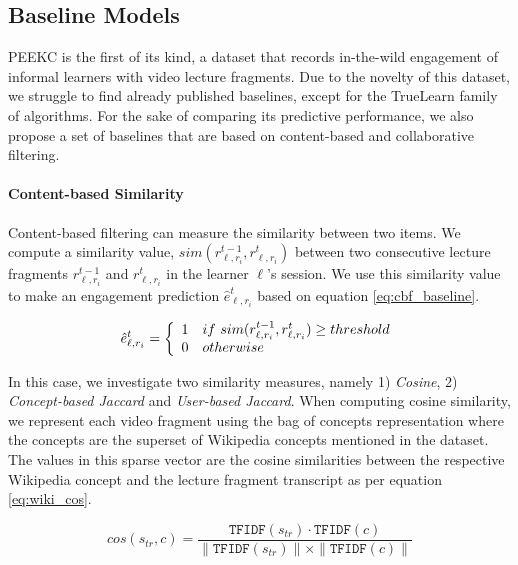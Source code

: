 \documentclass[letterpaper]{article} %
\begin{document}
\subsection{Baseline Models}

PEEKC is the first of its kind, a dataset that records in-the-wild  engagement of informal learners with video lecture fragments. Due to the novelty of this dataset, we struggle to find already published baselines, except for the TrueLearn family of algorithms. 
For the sake of comparing its predictive performance,  we also propose a set of baselines that are based on content-based and collaborative filtering.

\paragraph{Content-based Similarity} Content-based filtering can measure the similarity between two items. We compute a similarity value, $sim(r^{t-1}_{\ell,r_i},r^{t}_{\ell,r_i})$ between two consecutive lecture fragments $r^{t-1}_{\ell,r_i}$ and $r^{t}_{\ell,r_i}$ in the learner  $\ell$'s session. We use this similarity value to make an engagement prediction $\hat{e}^t_{\ell,r_i}$ based on equation \ref{eq:cbf_baseline}.

\begin{equation} \label{eq:cbf_baseline}\centering 
    \hat{e}^t_{\ell,r_i} = 
    \left\{ 
      \begin{array}{ c l }
        1                 &  if\ sim(r^{t-1}_{\ell,r_i},r^{t}_{\ell,r_i}) \geq threshold \\
        0                 & otherwise
      \end{array}
    \right.
\end{equation}

In this case, we investigate two similarity measures, namely 1) \emph{Cosine}, 2) \emph{Concept-based Jaccard} and \emph{User-based Jaccard}. When computing cosine similarity, we represent each video fragment using the bag of concepts representation where the concepts are the superset of Wikipedia concepts mentioned in the dataset. The values in this sparse vector are the cosine similarities between the respective Wikipedia concept and the lecture fragment transcript as per equation \ref{eq:wiki_cos}.

\begin{equation}\label{eq:wiki_cos}
        cos(s_{tr}, c) = \frac{\texttt{TFIDF}(s_{tr}) \cdot \texttt{TFIDF}(c)}
        {\|\texttt{TFIDF}(s_{tr})\| \times \|\texttt{TFIDF}(c)\|}
\end{equation}
\end{document}
